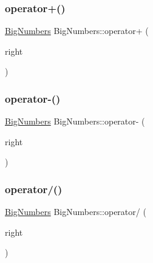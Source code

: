 \mbox{\label{class_big_numbers_a9571bdce2b62424020c3cd18f8fcd35d}} 
\subsubsection{\texorpdfstring{operator+()}{operator+()}}
{\footnotesize\ttfamily \mbox{\hyperlink{class_big_numbers}{Big\+Numbers}} Big\+Numbers\+::operator+ (\begin{DoxyParamCaption}\item[{const \mbox{\hyperlink{class_big_numbers}{Big\+Numbers}} \&}]{right }\end{DoxyParamCaption})}

\mbox{\label{class_big_numbers_ac8b9a03b6c074439aaa29417b743189b}} 
\subsubsection{\texorpdfstring{operator-\/()}{operator-()}}
{\footnotesize\ttfamily \mbox{\hyperlink{class_big_numbers}{Big\+Numbers}} Big\+Numbers\+::operator-\/ (\begin{DoxyParamCaption}\item[{const \mbox{\hyperlink{class_big_numbers}{Big\+Numbers}} \&}]{right }\end{DoxyParamCaption})}

\mbox{\label{class_big_numbers_aee7e1cdae1742cd7b6b1e469e1fda743}} 
\subsubsection{\texorpdfstring{operator/()}{operator/()}}
{\footnotesize\ttfamily \mbox{\hyperlink{class_big_numbers}{Big\+Numbers}} Big\+Numbers\+::operator/ (\begin{DoxyParamCaption}\item[{const \mbox{\hyperlink{class_big_numbers}{Big\+Numbers}} \&}]{right }\end{DoxyParamCaption})}

\mbox{\label{class_big_numbers_a1796791f2942db617426897c9cf6d9b7}} 
